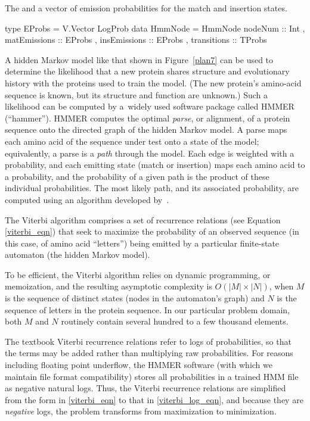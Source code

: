 \documentclass[preprint,nonatbib,blockstyle,nocopyrightspace,times]{sigplanconf}
\newcommand\figref[1]{Figure~\ref{#1}}
\newenvironment{smallverbatim}{\par\small\verbatim}{\endverbatim}
\begin{document}
The
and a vector of emission probabilities for the match and insertion states.
\begin{smallverbatim}
type EProbs = V.Vector LogProb
data HmmNode = HmmNode { nodeNum :: Int
                       , matEmissions :: EProbs
                       , insEmissions :: EProbs
                       , transitions :: TProbs
                       }
\end{smallverbatim}




A hidden Markov model like that shown in \figref{plan7} can be used to
determine the likelihood that a new protein shares structure and
evolutionary history with the proteins used to train the model.
(The new protein's amino-acid sequence is known, but its structure and
function are unknown.)
Such a likelihood can be computed by
a~widely used software package called HMMER (``hammer'').
HMMER computes the optimal \textit{parse}, or 
alignment, of a protein sequence onto the directed graph of the hidden Markov 
model.
A parse maps each amino acid of the sequence under test onto a state
of the model; equivalently, a parse is a \textit{path} through the model.
Each edge is weighted with a probability, and each emitting 
state (match or insertion) maps each amino acid to a probability,
and the 
probability of a given path is the product of these individual probabilities.
The most likely path, and its associated probability, are computed 
using an algorithm developed by~\citet{Viterbi:1967hq}.


The Viterbi algorithm comprises a set of recurrence 
relations (see Equation \ref{viterbi_eqn}) that seek to maximize the 
probability of an observed sequence (in this case, of amino acid ``letters'') 
being emitted by a particular finite-state automaton (the hidden Markov model).

To be efficient, the Viterbi 
algorithm relies on dynamic programming, or memoization, and the resulting 
asymptotic complexity is $O(|M|\times|N|)$, when $M$ is the sequence of 
distinct states (nodes in the automaton's graph) and $N$ is the sequence of 
letters in the protein sequence.
In our particular problem domain, both $M$ and 
$N$ routinely contain several hundred to a few thousand elements.

The textbook Viterbi recurrence relations refer to logs of probabilities, so 
that the terms may be added rather than multiplying raw probabilities.
For 
reasons including floating point underflow, the HMMER software (with which we 
maintain file format compatibility) stores all probabilities in a trained HMM 
file as negative natural logs.
Thus, the Viterbi recurrence relations are 
simplified from the form in \ref{viterbi_eqn} to that in \ref{viterbi_log_eqn}, 
and because they are \textit{negative} logs, the problem transforms from 
maximization to minimization.
\end{document}
